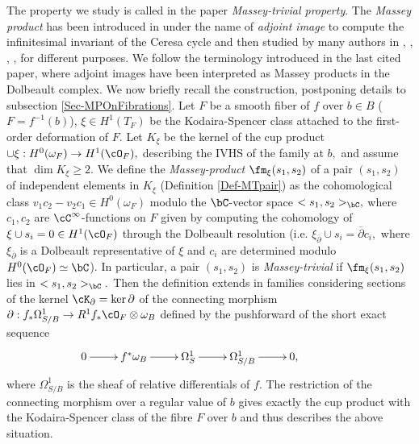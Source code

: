 \documentclass[a4paper,11pt]{amsart}
\newcommand{\del}{\partial}
\newcommand{\delbar}{\overline{\del}}
\begin{document}
The property we study is called in the paper {\em Massey-trivial property}. The {\em Massey product} has been introduced in \cite{C-P_TheGriffiths_1995} under the name of {\em  adjoint image} to compute the infinitesimal invariant of the Ceresa cycle and then studied by many authors in \cite{Gonz_OnDef_2016}, \cite{B-N-P_OnTheTopological_2007}, \cite{P-Z_Variations_2003}, \cite{RizZuc_Generalized_2017}, \cite{R_Infinitesimal_2008} for different purposes. 
We follow the terminology introduced in the last cited paper, where adjoint images have been interpreted as Massey products in the Dolbeault complex.
We now briefly recall the construction, postponing details to subsection \ref{Sec-MPOnFibrations}.
Let $F$ be a smooth fiber of $f$ over $b\in B$ ($F=f^{-1}(b)$), $\xi\in H^1(T_{F})$ be the  Kodaira-Spencer class attached to the first-order deformation of $F.$  Let $K_{\xi}$ be  the kernel of the cup product  $\cup {\xi}:H^0(\omega_{F})\to H^1(\cO_{F}),$  describing the IVHS of the family at $b,$ and assume that $\dim K_{\xi}\geq 2.$ We define  the {\em Massey-product} $\fm_{\xi}(s_1,s_2)$ of a pair $(s_1,s_2)$ of independent elements in $K_{\xi}$ (Definition \ref{Def-MTpair}) as the cohomological class $v_1c_2-v_2c_1\in H^0(\omega_F)$ modulo the $\bC$-vector space $<s_1,s_2>_\bC,$ where $c_1,c_2$ are $\cC^{\infty}$-functions on $F$ given by computing the cohomology of $\xi\cup s_i=0\in H^1(\cO_{F})$ through the Dolbeault resolution (i.e. $\xi_{\delbar}\cup s_i=\delbar c_i,$ where $\xi_{\delbar}$ is a Dolbeault representative of $\xi$ and  $c_i$ are determined modulo $H^0(\cO_F)\simeq \bC$). In particular, a pair $(s_1,s_2)$ is {\em Massey-trivial} if $\fm_{\xi}(s_1,s_2)$ lies in $<s_1,s_2>_\bC.$
Then the definition extends  in families considering sections of the kernel $\cK_\partial=\ker \partial$ of the connecting morphism $\partial:f_\ast \Omega^1_{S/B}\to R^1f_\ast\cO_F\otimes \omega_B $ defined by the pushforward of the short exact sequence  \begin{equation*}
\xymatrix@!R{
	{0}  & {f^\ast\omega_B}  & {\Omega^1_S}  & {\Omega^1_{S/B}}  & {0,}                                  & 
	\ar"1,1";"1,2"\ar"1,2";"1,3"\ar"1,3";"1,4"\ar"1,4";"1,5"
	\hole
}
\end{equation*}
where $\Omega^1_{S/B}$ is the sheaf of relative differentials of $f.$ The restriction of the connecting morphism over a regular value of $b$ gives exactly the cup product with the Kodaira-Spencer class of the fibre $F$ over $b$ and thus describes the above  situation. 
%
\end{document}
